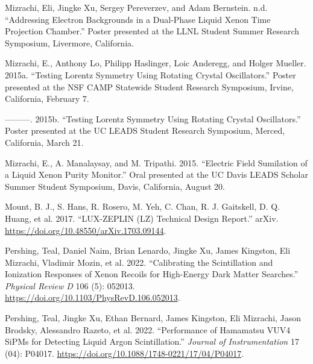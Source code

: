 \documentclass[
  10pt,
  letterpaper,
  DIV=11,
  numbers=noendperiod]{scrartcl}
\newlength{\cslhangindent}
\newlength{\cslentryspacingunit} %
\newenvironment{CSLReferences}[2] %
 {%
  \setlength{\parindent}{0pt}
  \ifodd #1
  \let\oldpar\par
  \def\par{\hangindent=\cslhangindent\oldpar}
  \fi
  \setlength{\parskip}{#2\cslentryspacingunit}
 }%
 {}
\begin{document}
\begin{CSLReferences}{1}{0}
\leavevmode{}%
Mizrachi, Eli, Jingke Xu, Sergey Pereverzev, and Adam Bernstein. n.d.
{``Addressing {Electron Backgrounds} in a {Dual-Phase Liquid Xenon Time
Projection Chamber}.''} Poster presented at the {LLNL Student Summer
Research Symposium}, {Livermore, California}.

\leavevmode{}%
Mizrachi, E., Anthony Lo, Philipp Haslinger, Loic Anderegg, and Holger
Mueller. 2015a. {``Testing {Lorentz Symmetry Using Rotating Crystal
Oscillators}.''} Poster presented at the {NSF CAMP Statewide Student
Research Symposium}, {Irvine, California}, February 7.

\leavevmode{}%
---------. 2015b. {``Testing {Lorentz Symmetry Using Rotating Crystal
Oscillators}.''} Poster presented at the {UC LEADS Student Research
Symposium}, {Merced, California}, March 21.

\leavevmode{}%
Mizrachi, E., A. Manalaysay, and M. Tripathi. 2015. {``Electric {Field
Sumilation} of a {Liquid Xenon Purity Monitor}.''} Oral presented at the
{UC Davis LEADS Scholar Summer Student Symposium}, {Davis, California},
August 20.

\leavevmode{}%
Mount, B. J., S. Hans, R. Rosero, M. Yeh, C. Chan, R. J. Gaitskell, D.
Q. Huang, et al. 2017. {``{LUX-ZEPLIN} ({LZ}) {Technical Design
Report}.''} {arXiv}. \url{https://doi.org/10.48550/arXiv.1703.09144}.

\leavevmode{}%
Pershing, Teal, Daniel Naim, Brian Lenardo, Jingke Xu, James Kingston,
Eli Mizrachi, Vladimir Mozin, et al. 2022. {``Calibrating the
Scintillation and Ionization Responses of Xenon Recoils for High-Energy
Dark Matter Searches.''} \emph{Physical Review D} 106 (5): 052013.
\url{https://doi.org/10.1103/PhysRevD.106.052013}.

\leavevmode{}%
Pershing, Teal, Jingke Xu, Ethan Bernard, James Kingston, Eli Mizrachi,
Jason Brodsky, Alessandro Razeto, et al. 2022. {``Performance of
{Hamamatsu VUV4 SiPMs} for Detecting Liquid Argon Scintillation.''}
\emph{Journal of Instrumentation} 17 (04): P04017.
\url{https://doi.org/10.1088/1748-0221/17/04/P04017}.

\end{CSLReferences}
\end{document}

